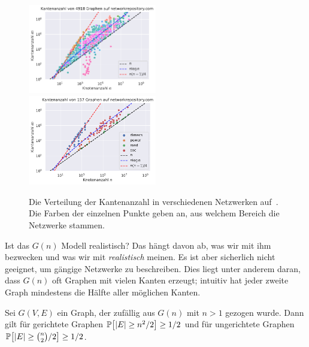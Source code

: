 \begin{figure}[t]
    \begin{center}
        \includegraphics[width=0.5\textwidth]{data/network-rep-edges.pdf}%
        \includegraphics[width=0.5\textwidth]{data/network-rep-edges-thin.pdf}%
    \end{center}
    \caption{
        Die Verteilung der Kantenanzahl in verschiedenen Netzwerken auf~\cite{networkrepository}.
        Die Farben der einzelnen Punkte geben an, aus welchem Bereich die Netzwerke stammen.
    }
    \label{fig:kantenanzahl}
\end{figure}

Ist das $G(n)$ Modell realistisch?
Das hängt davon ab, was wir mit ihm bezwecken und was wir mit \emph{realistisch} meinen.
Es ist aber sicherlich nicht geeignet, um gängige Netzwerke zu beschreiben.
Dies liegt unter anderem daran, dass $G(n)$ oft Graphen mit vielen Kanten erzeugt;
intuitiv hat \glqq jeder zweite Graph\grqq{} mindestens die Hälfte aller möglichen Kanten.

\begin{observation}
    Sei $G(V,E)$ ein Graph, der zufällig aus $G(n)$ mit $n > 1$ gezogen wurde.
    Dann gilt für gerichtete Graphen $\mathbb{P}\!\left[|E| \ge n^2 / 2\right] \ge 1/2$ und für ungerichtete Graphen $\mathbb{P}\!\left[|E| \ge \binom{n}{2} / 2\right] \ge 1/2$.
\end{observation}

